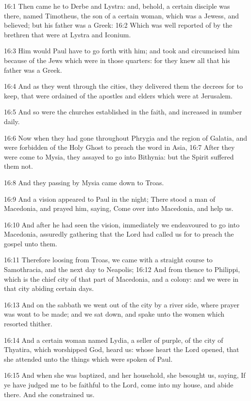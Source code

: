 16:1 Then came he to Derbe and Lystra: and, behold, a certain disciple
was there, named Timotheus, the son of a certain woman, which was a
Jewess, and believed; but his father was a Greek: 16:2 Which was well
reported of by the brethren that were at Lystra and Iconium.

16:3 Him would Paul have to go forth with him; and took and
circumcised him because of the Jews which were in those quarters: for
they knew all that his father was a Greek.

16:4 And as they went through the cities, they delivered them the
decrees for to keep, that were ordained of the apostles and elders
which were at Jerusalem.

16:5 And so were the churches established in the faith, and increased
in number daily.

16:6 Now when they had gone throughout Phrygia and the region of
Galatia, and were forbidden of the Holy Ghost to preach the word in
Asia, 16:7 After they were come to Mysia, they assayed to go into
Bithynia: but the Spirit suffered them not.

16:8 And they passing by Mysia came down to Troas.

16:9 And a vision appeared to Paul in the night; There stood a man of
Macedonia, and prayed him, saying, Come over into Macedonia, and help
us.

16:10 And after he had seen the vision, immediately we endeavoured to
go into Macedonia, assuredly gathering that the Lord had called us for
to preach the gospel unto them.

16:11 Therefore loosing from Troas, we came with a straight course to
Samothracia, and the next day to Neapolis; 16:12 And from thence to
Philippi, which is the chief city of that part of Macedonia, and a
colony: and we were in that city abiding certain days.

16:13 And on the sabbath we went out of the city by a river side,
where prayer was wont to be made; and we sat down, and spake unto the
women which resorted thither.

16:14 And a certain woman named Lydia, a seller of purple, of the city
of Thyatira, which worshipped God, heard us: whose heart the Lord
opened, that she attended unto the things which were spoken of Paul.

16:15 And when she was baptized, and her household, she besought us,
saying, If ye have judged me to be faithful to the Lord, come into my
house, and abide there. And she constrained us.

